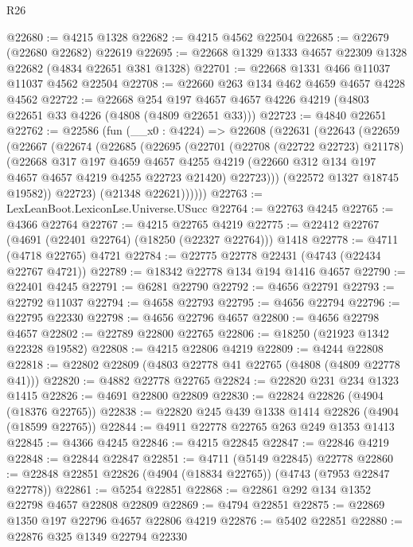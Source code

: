 \begin{lexlean}{R26}
\begin{coremodule}
@22680 := @4215 @1328
@22682 := @4215 @4562 @22504
@22685 := @22679 (@22680 @22682) @22619
@22695 := @22668 @1329 @1333 @4657 @22309 @1328 @22682 (@4834 @22651 @381 @1328)
@22701 := @22668 @1331 @466 @11037 @11037 @4562 @22504
@22708 := @22660 @263 @134 @462 @4659 @4657 @4228 @4562
@22722 := @22668
    @254
    @197
    @4657
    @4657
    @4226
    @4219
    (@4803 @22651 @33 @4226 (@4808 (@4809 @22651 @33)))
@22723 := @4840 @22651
@22762 := @22586
    (fun (__x0 : @4224) =>
    @22608
      (@22631
        (@22643
          (@22659
            (@22667
              (@22674
                (@22685
                  (@22695
                    (@22701
                      (@22708 (@22722 @22723) @21178)
                      (@22668
                        @317
                        @197
                        @4659
                        @4657
                        @4255
                        @4219
                        (@22660 @312 @134 @197 @4657 @4657 @4219 @4255 @22723 @21420)
                        @22723)))
                  (@22572 @1327 @18745 @19582))
                @22723)
              (@21348 @22621))))))
@22763 := LexLeanBoot.LexiconLse.Universe.USucc
@22764 := @22763 @4245
@22765 := @4366 @22764
@22767 := @4215 @22765 @4219
@22775 := @22412 @22767 (@4691 (@22401 @22764) (@18250 (@22327 @22764))) @1418
@22778 := @4711 (@4718 @22765) @4721
@22784 := @22775 @22778 @22431 (@4743 (@22434 @22767 @4721))
@22789 := @18342 @22778 @134 @194 @1416 @4657
@22790 := @22401 @4245
@22791 := @6281 @22790
@22792 := @4656 @22791
@22793 := @22792 @11037
@22794 := @4658 @22793
@22795 := @4656 @22794
@22796 := @22795 @22330
@22798 := @4656 @22796 @4657
@22800 := @4656 @22798 @4657
@22802 := @22789 @22800 @22765
@22806 := @18250 (@21923 @1342 @22328 @19582)
@22808 := @4215 @22806 @4219
@22809 := @4244 @22808
@22818 := @22802 @22809 (@4803 @22778 @41 @22765 (@4808 (@4809 @22778 @41)))
@22820 := @4882 @22778 @22765
@22824 := @22820 @231 @234 @1323 @1415
@22826 := @4691 @22800 @22809
@22830 := @22824 @22826 (@4904 (@18376 @22765))
@22838 := @22820 @245 @439 @1338 @1414 @22826 (@4904 (@18599 @22765))
@22844 := @4911 @22778 @22765 @263 @249 @1353 @1413
@22845 := @4366 @4245
@22846 := @4215 @22845
@22847 := @22846 @4219
@22848 := @22844 @22847
@22851 := @4711 (@5149 @22845) @22778
@22860 := @22848 @22851 @22826 (@4904 (@18834 @22765)) (@4743 (@7953 @22847 @22778))
@22861 := @5254 @22851
@22868 := @22861 @292 @134 @1352 @22798 @4657 @22808 @22809
@22869 := @4794 @22851
@22875 := @22869 @1350 @197 @22796 @4657 @22806 @4219
@22876 := @5402 @22851
@22880 := @22876 @325 @1349 @22794 @22330

\end{coremodule}
\end{lexlean}
